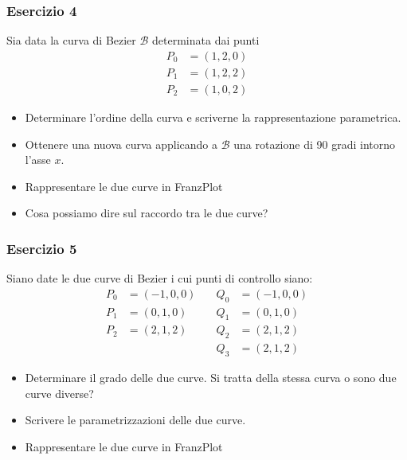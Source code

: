 \documentclass{beamer}
\newcommand{\frnzplt}{FranzPlot }
\begin{document}
\begin{frame}
\frametitle{Esercizio 4}
Sia data la curva di Bezier $\mathcal B$ determinata dai punti
\begin{align}
P_0 &= (1,2,0 )\nonumber\\
P_1 &= (1,2,2 )\nonumber\\
P_2 &= (1,0,2 )\nonumber
\end{align}
\begin{itemize}
\item Determinare l'ordine della curva e scriverne la rappresentazione parametrica.
\item Ottenere una nuova curva applicando a $\mathcal B$ una rotazione di 90 gradi intorno l'asse $x$.
\item Rappresentare le due curve in \frnzplt
\item Cosa possiamo dire sul raccordo tra le due curve?
\end{itemize}
\end{frame}
%
%
\begin{frame}
\frametitle{Esercizio 5}
Siano date le due curve di Bezier i cui punti di controllo siano:
\begin{align*}
    P_0 &= (-1,0,0) \quad & Q_0 &= (-1, 0, 0)\\
    P_1 &= (0,1,0) \quad & Q_1 &= (0, 1, 0)\\
    P_2 &= (2,1,2) \quad & Q_2 &= (2, 1, 2) \\
    & \quad & Q_3 &= (2, 1, 2)
\end{align*}
\begin{itemize}
\item Determinare il grado delle due curve. Si tratta della stessa curva o sono due curve diverse?
\item Scrivere le parametrizzazioni delle due curve.
\item Rappresentare le due curve in \frnzplt
\end{itemize}
\end{frame}
\end{document}
